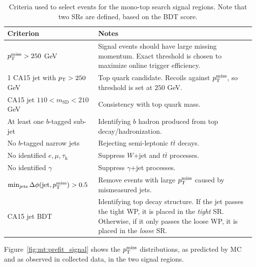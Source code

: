 \begin{table}[]
    \caption{Criteria used to select events for the mono-top search signal regions. Note that two SRs are defined, based on the BDT score.}
    \label{tab:mt:cuts}
    \begin{tabular}{p{}p{}}
        Criterion & Notes \\
        \hline
        \hline
        $p_\mathrm{T}^\mathrm{miss}>250$ GeV & Signal events should have large missing momentum. Exact threshold is chosen to maximize online trigger efficiency. \\
        1 CA15 jet with $p_\mathrm{T}>250$ GeV & Top quark candidate. Recoils against $p_\mathrm{T}^\mathrm{miss}$, so threshold is set at $250$ GeV. \\
        CA15 jet $110 < m_\mathrm{SD} < 210$ GeV & Consistency with top quark mass. \\
        At least one $b$-tagged sub-jet & Identifying $b$ hadron produced from top decay/hadronization. \\
        No $b$-tagged narrow jets & Rejecting semi-leptonic $t\bar{t}$ decays. \\
        \hline
        No identified $e,\mu,\tau_\mathrm{h}$ & Suppress $W$+jet and $t\bar{t}$ processes. \\
        No identified $\gamma$ & Suppress $\gamma$+jet processes. \\
        \hline
        $\min_\mathrm{jets}\Delta\phi(\mathrm{jet},p_\mathrm{T}^\mathrm{miss}) > 0.5$ & Remove events with large $p_\mathrm{T}^\mathrm{miss}$ caused by mismeasured jets. \\
        \hline
        CA15 jet BDT & Identifying top decay structure. If the jet passes the tight WP, it is placed in the \emph{tight} SR. Otherwise, if it only passes the loose WP, it is placed in the \emph{loose} SR.\\
    \end{tabular}
\end{table}

Figure~\ref{fig:mt:prefit_signal} shows the $p_\mathrm{T}^\mathrm{miss}$ distributions, as predicted by MC and as observed in collected data, in the two signal regions.

